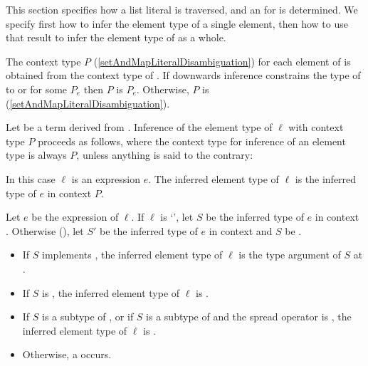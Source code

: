 \documentclass[makeidx]{article}
\begin{document}
{\LMHash{}%
This section specifies how a list literal
 is traversed, and an
for  is determined.
We specify first how to infer the element type of a single element,
then how to use that result to infer
the element type of  as a whole.

\LMHash{}%
%
The context type $P$
(\ref{setAndMapLiteralDisambiguation})
for each element of  is
obtained from the context type of .
If downwards inference constrains the type of 
to  or  for some $P_e$
then $P$ is $P_e$.
Otherwise, $P$ is \FreeContext{}
(\ref{setAndMapLiteralDisambiguation}).

\LMHash{}%
Let \DefineSymbol{\ell} be a term derived from .
Inference of the element type of $\ell$ with context type $P$
proceeds as follows,
where the context type for inference of an element type is always $P$,
unless anything is said to the contrary:

\LMHash{}%
In this case $\ell$ is an expression $e$.
The inferred element type of $\ell$ is
the inferred type of $e$ in context $P$.
\EndCase

\LMHash{}%
\EndCase

\LMHash{}%
%
Let $e$ be the expression of $\ell$.
If $\ell$ is `',
let $S$ be the inferred type of $e$ in context .
Otherwise
(),
let $S'$ be the inferred type of $e$ in context 
and $S$ be .

\begin{itemize}
\item
  If $S$ implements ,
  the inferred element type of $\ell$ is
  the type argument of $S$ at .
\item
  If $S$ is \DYNAMIC,
  the inferred element type of $\ell$ is \DYNAMIC.
\item
  If $S$ is a subtype of ,
  or if $S$ is a subtype of  and the spread operator is ,
  the inferred element type of $\ell$ is .
\item
  Otherwise, a  occurs.
\end{itemize}
\vspace{-5mm}
\EndCase

}
\end{document}
